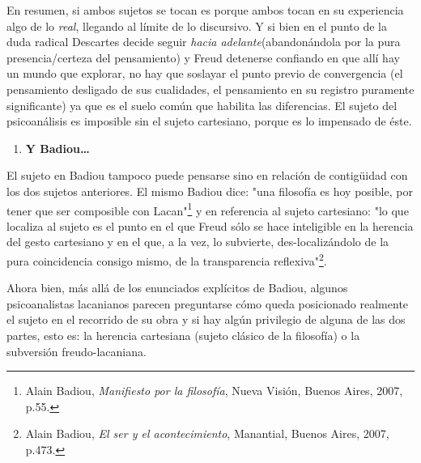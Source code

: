 \documentclass{book}
\begin{document}
En resumen, si ambos sujetos se tocan es porque ambos tocan en su
experiencia algo de lo \emph{real}, llegando al límite de lo discursivo.
Y si bien en el punto de la duda radical Descartes decide seguir
\emph{hacia adelante}(abandonándola por la pura presencia/certeza del
pensamiento) y Freud detenerse confiando en que allí hay un mundo que
explorar, no hay que soslayar el punto previo de convergencia (el
pensamiento desligado de sus cualidades, el pensamiento en su registro
puramente significante) ya que es el suelo común que habilita las
diferencias. El sujeto del psicoanálisis es imposible sin el sujeto
cartesiano, porque es lo impensado de éste.

\begin{enumerate}
\def\labelenumi{\arabic{enumi}.}
\setcounter{enumi}{2}
\item
  \textbf{Y Badiou\ldots{}}
\end{enumerate}

El sujeto en Badiou tampoco puede pensarse sino en relación de
contigüidad con los dos sujetos anteriores. El mismo Badiou dice: "una
filosofía es hoy posible, por tener que ser composible con
Lacan"\footnote{Alain Badiou, \emph{Manifiesto por la filosofía}, Nueva
  Visión, Buenos Aires, 2007, p.55.} y en referencia al sujeto
cartesiano: "lo que localiza al sujeto es el punto en el que Freud sólo
se hace inteligible en la herencia del gesto cartesiano y en el que, a
la vez, lo subvierte, des-localizándolo de la pura coincidencia consigo
mismo, de la transparencia reflexiva"\footnote{Alain Badiou, \emph{El
  ser y el acontecimiento}, Manantial, Buenos Aires, 2007, p.473.}.

Ahora bien, más allá de los enunciados explícitos de Badiou, algunos
psicoanalistas lacanianos parecen preguntarse cómo queda posicionado
realmente el sujeto en el recorrido de su obra y si hay algún privilegio
de alguna de las dos partes, esto es: la herencia cartesiana (sujeto
clásico de la filosofía) o la subversión freudo-lacaniana.
\end{document}
